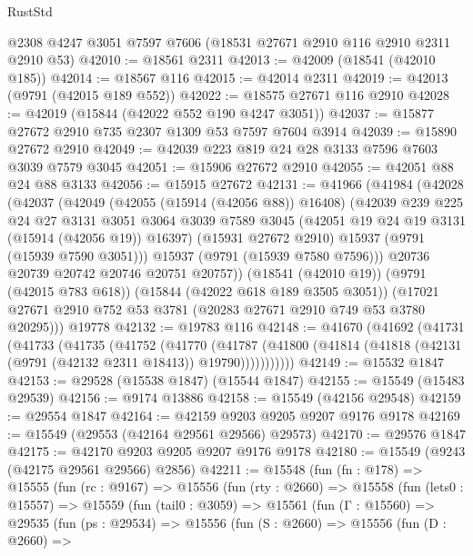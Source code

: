 \begin{lexlean}{RustStd}
\begin{coremodule}
    @2308
    @4247
    @3051
    @7597
    @7606
    (@18531 @27671 @2910 @116 @2910 @2311 @2910 @53)
@42010 := @18561 @2311
@42013 := @42009 (@18541 (@42010 @185))
@42014 := @18567 @116
@42015 := @42014 @2311
@42019 := @42013 (@9791 (@42015 @189 @552))
@42022 := @18575 @27671 @116 @2910
@42028 := @42019 (@15844 (@42022 @552 @190 @4247 @3051))
@42037 := @15877 @27672 @2910 @735 @2307 @1309 @53 @7597 @7604 @3914
@42039 := @15890 @27672 @2910
@42049 := @42039 @223 @819 @24 @28 @3133 @7596 @7603 @3039 @7579 @3045
@42051 := @15906 @27672 @2910
@42055 := @42051 @88 @24 @88 @3133
@42056 := @15915 @27672
@42131 := @41966
    (@41984
      (@42028
        (@42037
          (@42049
            (@42055 (@15914 (@42056 @88)) @16408)
            (@42039
              @239
              @225
              @24
              @27
              @3131
              @3051
              @3064
              @3039
              @7589
              @3045
              (@42051 @19 @24 @19 @3131 (@15914 (@42056 @19)) @16397)
              (@15931 @27672 @2910)
              @15937
              (@9791 (@15939 @7590 @3051)))
            @15937
            (@9791 (@15939 @7580 @7596)))
          @20736
          @20739
          @20742
          @20746
          @20751
          @20757))
      (@18541 (@42010 @19))
      (@9791 (@42015 @783 @618))
      (@15844 (@42022 @618 @189 @3505 @3051))
      (@17021 @27671 @2910 @752 @53 @3781 (@20283 @27671 @2910 @749 @53 @3780 @20295)))
    @19778
@42132 := @19783 @116
@42148 := @41670
    (@41692
      (@41731
        (@41733
          (@41735
            (@41752
              (@41770
                (@41787
                  (@41800 (@41814 (@41818 (@42131 (@9791 (@42132 @2311 @18413)) @19790)))))))))))
@42149 := @15532 @1847
@42153 := @29528 (@15538 @1847) (@15544 @1847)
@42155 := @15549 (@15483 @29539)
@42156 := @9174 @13886
@42158 := @15549 (@42156 @29548)
@42159 := @29554 @1847
@42164 := @42159 @9203 @9205 @9207 @9176 @9178
@42169 := @15549 (@29553 (@42164 @29561 @29566) @29573)
@42170 := @29576 @1847
@42175 := @42170 @9203 @9205 @9207 @9176 @9178
@42180 := @15549 (@9243 (@42175 @29561 @29566) @2856)
@42211 := @15548
    (fun (fn : @178) =>
    @15555
      (fun (rc : @9167) =>
      @15556
        (fun (rty : @2660) =>
        @15558
          (fun (lets0 : @15557) =>
          @15559
            (fun (tail0 : @3059) =>
            @15561
              (fun (Γ : @15560) =>
              @29535
                (fun (ps : @29534) =>
                @15556
                  (fun (S : @2660) =>
                  @15556
                    (fun (D : @2660) =>

\end{coremodule}
\end{lexlean}
